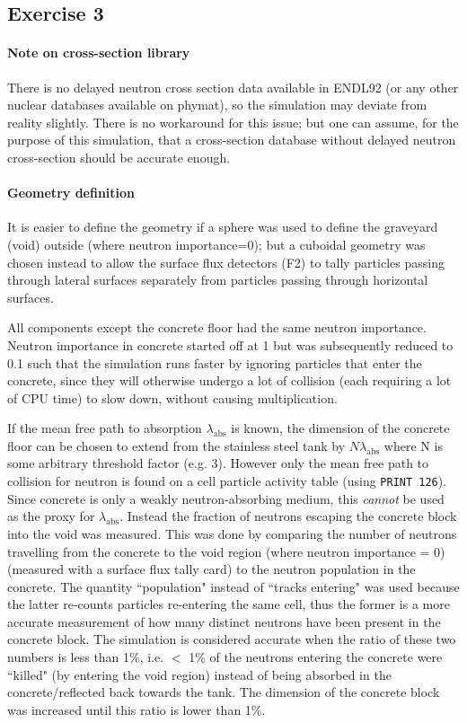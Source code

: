 \documentclass[a4paper, 12pt]{article}
\begin{document}
\subsection{Exercise 3}
\paragraph{Note on cross-section library\indent} There is no delayed neutron cross section data available in ENDL92 (or any other nuclear databases available on phymat), so the simulation may deviate from reality slightly. There is no workaround for this issue; but one can assume, for the purpose of this simulation, that a cross-section database without delayed neutron cross-section should be accurate enough.

\paragraph{Geometry definition\indent} It is easier to define the geometry if a sphere was used to define the graveyard (void) outside (where neutron importance=0); but a cuboidal geometry was chosen instead to allow the surface flux detectors (F2) to tally particles passing through lateral surfaces separately from particles passing through horizontal surfaces.

All components except the concrete floor had the same neutron importance. Neutron importance in concrete started off at 1 but was subsequently reduced to 0.1 such that the simulation runs faster by ignoring particles that enter the concrete, since they will otherwise undergo a lot of collision (each requiring a lot of CPU time) to slow down, without causing multiplication.

If the mean free path to absorption $\lambda_{\text{abs}}$ is known, the dimension of the concrete floor can be chosen to extend from the stainless steel tank by $N\lambda_{\text{abs}}$ where N is some arbitrary threshold factor (e.g. 3).
However only the mean free path to collision for neutron is found on a cell particle activity table (using \texttt{PRINT 126}). Since concrete is only a weakly neutron-absorbing medium, this \emph{cannot} be used as the proxy for $\lambda_{\text{abs}}$. 
Instead the fraction of neutrons escaping the concrete block into the void was measured. This was done by comparing the number of neutrons travelling from the concrete to the void region (where neutron importance = 0) (measured with a surface flux tally card) to the neutron population in the concrete. The quantity ``population" instead of ``tracks entering" was used because the latter re-counts particles re-entering the same cell, thus the former is a more accurate measurement of how many distinct neutrons have been present in the concrete block. The simulation is considered accurate when the ratio of these two numbers is less than 1\%, i.e. $<$ 1\% of the neutrons entering the concrete were ``killed" (by entering the void region) instead of being absorbed in the concrete/reflected back towards the tank. The dimension of the concrete block was increased until this ratio is lower than 1\%.
\end{document}
